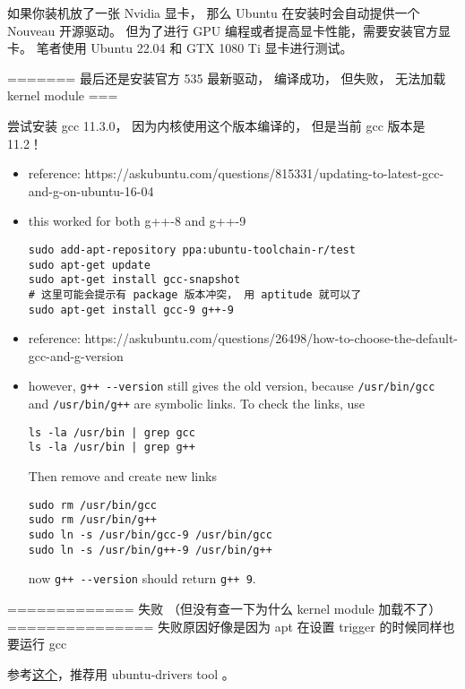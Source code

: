 
如果你装机放了一张 Nvidia 显卡， 那么 Ubuntu 在安装时会自动提供一个 Nouveau 开源驱动。 但为了进行 GPU 编程或者提高显卡性能，需要安装官方显卡。 笔者使用 Ubuntu 22.04 和 GTX 1080 Ti 显卡进行测试。

======= 最后还是安装官方 535 最新驱动， 编译成功， 但失败， 无法加载 kernel module ===

尝试安装 gcc 11.3.0， 因为内核使用这个版本编译的， 但是当前 gcc 版本是 11.2！

\begin{itemize}
\item reference: https://askubuntu.com/questions/815331/updating-to-latest-gcc-and-g-on-ubuntu-16-04
\item this worked for both g++-8 and g++-9
\begin{lstlisting}[language=none]
sudo add-apt-repository ppa:ubuntu-toolchain-r/test
sudo apt-get update
sudo apt-get install gcc-snapshot
# 这里可能会提示有 package 版本冲突， 用 aptitude 就可以了
sudo apt-get install gcc-9 g++-9
\end{lstlisting}
\item reference: https://askubuntu.com/questions/26498/how-to-choose-the-default-gcc-and-g-version
\item however, \verb`g++ --version` still gives the old version, because \verb`/usr/bin/gcc` and \verb`/usr/bin/g++` are symbolic links. To check the links, use
\begin{lstlisting}[language=none]
ls -la /usr/bin | grep gcc
ls -la /usr/bin | grep g++
\end{lstlisting}
Then remove and create new links
\begin{lstlisting}[language=none]
sudo rm /usr/bin/gcc
sudo rm /usr/bin/g++
sudo ln -s /usr/bin/gcc-9 /usr/bin/gcc
sudo ln -s /usr/bin/g++-9 /usr/bin/g++
\end{lstlisting}
now \verb`g++ --version` should return \verb`g++ 9`.
\end{itemize}



============= 失败 （但没有查一下为什么 kernel module 加载不了） ===============
失败原因好像是因为 apt 在设置 trigger 的时候同样也要运行 gcc

参考\href{https://ubuntu.com/server/docs/nvidia-drivers-installation}{这个}，推荐用 ubuntu-drivers tool 。

